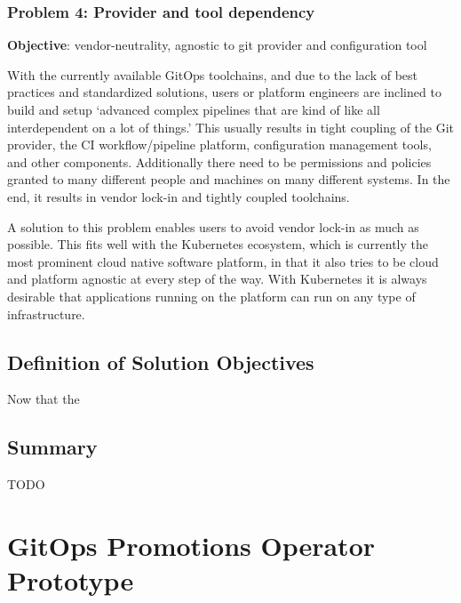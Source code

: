 \subsection{Problem 4: Provider and tool dependency}

\textbf{Objective}: vendor-neutrality, agnostic to git provider and configuration tool

With the currently available GitOps toolchains,
and due to the lack of best practices and standardized solutions,
users or platform engineers are inclined to build
and setup
\enquote*{advanced complex pipelines that are kind of like all interdependent on a lot of things.}
This usually results in tight coupling of the Git provider, the CI workflow/pipeline platform,
configuration management tools, and other components.
Additionally there need to be permissions and policies granted to many different people and
machines on many different systems.
In the end, it results in vendor lock-in and tightly coupled toolchains.

A solution to this problem enables users to avoid vendor lock-in as much as possible.
This fits well with the Kubernetes ecosystem, which is currently the most prominent
cloud native software platform,
in that it also tries to be cloud and platform agnostic at every step of the way.
With Kubernetes it is always desirable that applications running on the platform can
run on any type of infrastructure.





\section{Definition of Solution Objectives}\label{interviews:definitionSolutionObjectives}


Now that the 






\section{Summary}

TODO











\chapter{GitOps Promotions Operator Prototype}
\label{chapter:prototype}

